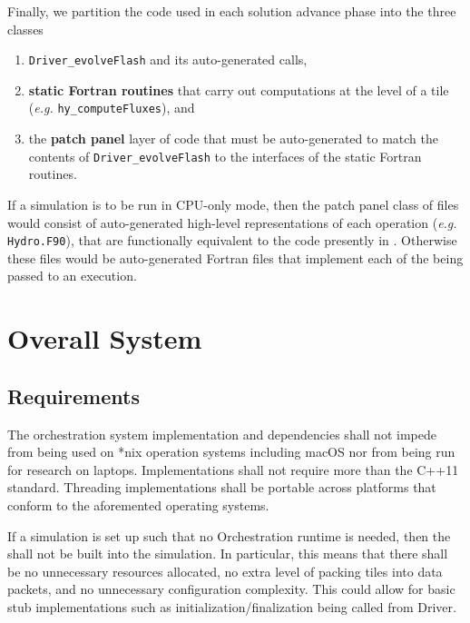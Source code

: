 \documentclass{article}
\begin{document}
Finally, we partition the code used in each solution advance phase into the three classes
\begin{enumerate}
\item{\texttt{Driver\_evolveFlash} and its auto-generated \OR calls,}
\item{\textbf{static Fortran routines} that carry out computations at the
level of a tile (\textit{e.g.} \texttt{hy\_computeFluxes}), and}
\item{the \textbf{patch panel} layer of code that must be auto-generated to
match the contents of \texttt{Driver\_evolveFlash} to the interfaces of the
static Fortran routines.}
\end{enumerate}
If a simulation is to be run in CPU-only mode, then the patch panel class of files
would consist of auto-generated high-level representations of each operation
(\textit{e.g.} \texttt{Hydro.F90}), that are functionally equivalent to the code presently
in \FlashOfTheFuture.  Otherwise these files would be auto-generated Fortran files that
implement each of the \taskroutines being passed to an \OR execution.\\


\section{Overall System}
\subsection{Requirements}

\begin{req}
The orchestration system implementation and dependencies shall not impede \FlashOfTheFuture
from being used on *nix operation systems including macOS nor from being run for
research on laptops.  Implementations shall not require more than the C++11
standard. Threading implementations shall be portable across platforms that
conform to the aforemented operating systems.
\end{req}

\begin{req}
If a simulation is set up such that no Orchestration runtime is needed, then the
\OR shall not be built into the simulation.  In particular, this means that
there shall be no unnecessary resources allocated, no extra level of packing
tiles into data packets, and no unnecessary configuration complexity.  This
could allow for basic stub implementations such as initialization/finalization
being called from Driver.
\end{req}
\end{document}
